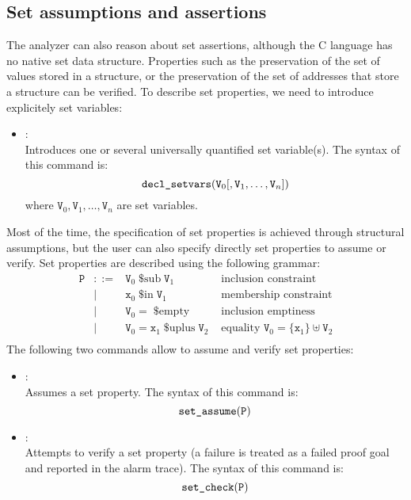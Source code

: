 \subsection{Set assumptions and assertions}
The \memcad analyzer can also reason about set assertions, although
the C language has no native set data structure.
Properties such as the preservation of the set of values stored in a
structure, or the preservation of the set of addresses that store a
structure can be verified.
To describe set properties, we need to introduce explicitely set
variables:
\begin{itemize}
\item[\dcommand{decl\_setvars}]: \\
  Introduces one or several universally quantified set variable(s).
  The syntax of this command is:
  \[
  \texttt{decl\_setvars}( \texttt{V}_0 [, \texttt{V}_1, \ldots,
  \texttt{V}_n ] )
  \]
  where \( \texttt{V}_0, \texttt{V}_1, \ldots, \texttt{V}_n \) are
  set variables.
\end{itemize}
Most of the time, the specification of set properties is achieved
through structural assumptions, but the user can also specify directly
set properties to assume or verify.
Set properties are described using the following grammar:
\[
\begin{array}{rcll}
  \texttt{P}
  & ::=
  & \texttt{V}_0 \mathop{\texttt{\$sub}} \texttt{V}_1
  & \text{ inclusion constraint}
  \\
  & |
  & \texttt{x}_0 \mathop{\texttt{\$in}} \texttt{V}_1
  & \text{ membership constraint}
  \\
  & |
  & \texttt{V}_0 = \mathop{\texttt{\$empty}}
  & \text{ inclusion emptiness}
  \\
  & |
  & \texttt{V}_0 = \texttt{x}_1 \mathop{\texttt{\$uplus}} \texttt{V}_2
  & \text{ equality } \texttt{V}_0 = \{ \texttt{x}_1 \} \uplus \texttt{V}_2
  \\
\end{array}
\]
The following two commands allow to assume and verify set properties:
\begin{itemize}
\item[\dcommand{set\_assume}]: \\
  Assumes a set property.
  The syntax of this command is:
  \[
  \texttt{set\_assume}( \texttt{P} )
  \]
\item[\dcommand{set\_check}]: \\
  Attempts to verify a set property (a failure is treated as a failed
  proof goal and reported in the alarm trace).
  The syntax of this command is:
  \[
  \texttt{set\_check}( \texttt{P} )
  \]
\end{itemize}

